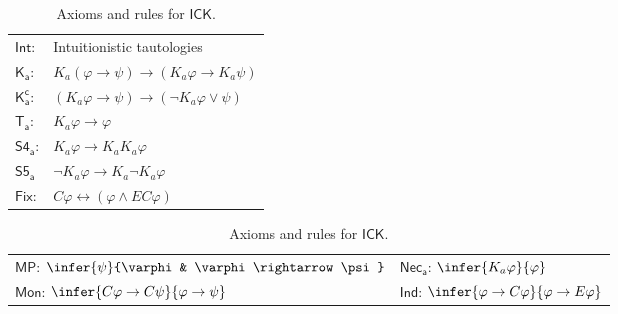\documentclass{myifcolog}
\newcommand\C {C}
\newcommand{\K}{K}
\newcommand{\agi}{a}
\newcommand{\E}{E}
\newcommand{\ICK}{\mathsf{ICK}}
\numberwithin{theorem}{section}
\begin{document}
\begin{table}
\centering
        \begin{tabular}{|l l|}
        \hline
         $\mathsf{Int}$: &  Intuitionistic tautologies  \\
         $\mathsf{K_\agi}$: & $\K_\agi(\varphi \rightarrow \psi) \rightarrow (\K_\agi \varphi \rightarrow \K_\agi \psi)$  \\
          $\mathsf{\K_\agi^c}$:& $(\K_\agi \varphi \rightarrow \psi) \rightarrow (\neg \K_\agi \varphi \vee \psi)$  \\
          $\mathsf{T_\agi}$:&  $\K_\agi \varphi \rightarrow \varphi$   \\
         $\mathsf{S4_\agi}$:& $\K_\agi \varphi \rightarrow \K_\agi \K_\agi \varphi$  \\
         $\mathsf{S5_\agi}$ & $\neg \K_\agi \varphi \rightarrow \K_\agi \neg \K_\agi \varphi$ \\
         $\mathsf{Fix}$:& $\C \varphi \leftrightarrow (\varphi \wedge \E \C \varphi)$  \\
         \hline
        \end{tabular}
     \quad
     \begin{tabular}{|l l|}
        \hline
        $\mathsf{MP}$: $\infer{\psi}{\varphi & \varphi \rightarrow \psi}$ & $\mathsf{Nec_\agi}$: $\infer{\K_\agi \varphi}{\varphi}$ \\
         $\mathsf{Mon}$: $\infer{\C \varphi \rightarrow \C \psi}{\varphi \rightarrow \psi}$ &  $\mathsf{Ind}$: $\infer{\varphi \rightarrow \C \varphi}{\varphi \rightarrow \E \varphi}$\\
         \hline
        \end{tabular}
     \caption{Axioms and rules for $\ICK$.}  
     \label{t: axioms and rules of Hilbert system}
\end{table}
\end{document}
